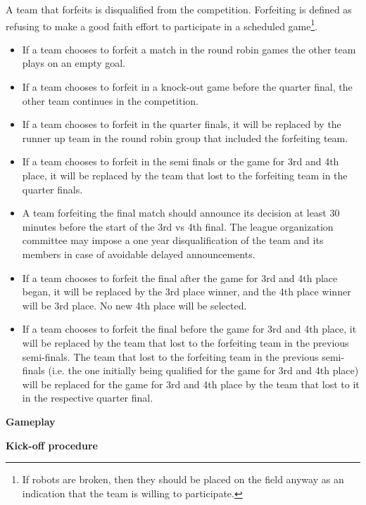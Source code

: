 \headlinebox
A team that forfeits is disqualified from the competition. Forfeiting is defined as refusing to make a good faith effort to participate in a scheduled game\footnote{If robots are broken, then they should be placed on the field anyway as an indication that the team is willing to participate.}.
\begin{itemize}
\item If a team chooses to forfeit a match in the round robin games the other team plays on an empty goal.
\item If a team chooses to forfeit in a knock-out game before the quarter final, the other team continues in the competition.
\item If a team chooses to forfeit in the quarter finals, it will be replaced by the runner up team in the round robin group that included the forfeiting team.
\item If a team chooses to forfeit in the semi finals or the game for 3rd and 4th place, it will be replaced by the team that lost to the forfeiting team in the quarter finals.
\item A team forfeiting the final match should announce its decision at least 30 minutes before the start of the 3rd vs 4th final.  The league organization committee may impose a one year disqualification of the team and its members in case of avoidable delayed announcements.
\item If a team chooses to forfeit the final after the game for 3rd and 4th place began, it will be replaced by the 3rd place winner, and the 4th place winner will be 3rd place. No new 4th place will be selected.
\item If a team chooses to forfeit the final before the game for 3rd and 4th place, it will be replaced by the team that lost to the forfeiting team in the previous semi-finals. The team that lost to the forfeiting team in the previous semi-finals (i.e. the one initially being qualified for the game for 3rd and 4th place) will be replaced for the game for 3rd and 4th place by the team that lost to it in the respective quarter final.
\end{itemize}

{\bfseries Gameplay}

\headlinebox
 
{\bfseries Kick-off procedure}

